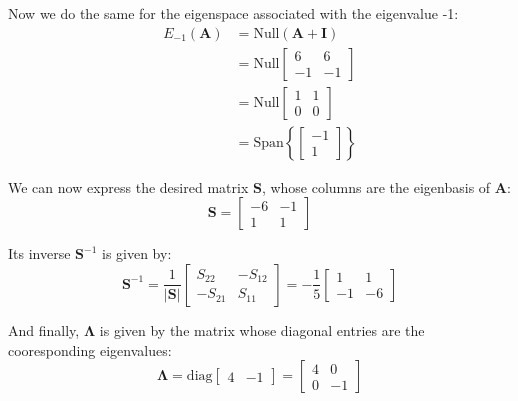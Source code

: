 \documentclass{article}
\begin{document}
Now we do the same for the eigenspace associated with the eigenvalue -1:
\begin{align*}
    E_{-1}(\mathbf{A})&=\text{Null}(\mathbf{A}+\mathbf{I})\tag{def. of eigenspace}\\
    &=\text{Null}\begin{bmatrix} 6 & 6 \\ -1 & -1 \end{bmatrix}\\
    &=\text{Null}\begin{bmatrix} 1 & 1 \\ 0 & 0 \end{bmatrix}\tag{rref}\\
    &=\text{Span}\left\{\begin{bmatrix} -1\\1\end{bmatrix}\right\}\tag{$x_1=-x_2$}
\end{align*}

We can now express the desired matrix $\mathbf{S}$, whose columns are the eigenbasis of $\mathbf{A}$:
\begin{equation*}
    \mathbf{S}=\begin{bmatrix} -6&-1\\1&1\end{bmatrix}
\end{equation*}

Its inverse $\mathbf{S}^{-1}$ is given by:
\begin{equation*}
\mathbf{S}^{-1}=\frac{1}{|\mathbf{S}|}\begin{bmatrix} S_{22}&-S_{12}\\-S_{21}&S_{11}\end{bmatrix}=-\frac{1}{5}\begin{bmatrix} 1&1\\-1&-6\end{bmatrix}
\end{equation*}

And finally, $\mathbf{\Lambda}$ is given by the matrix whose diagonal entries are the cooresponding eigenvalues:
\begin{equation*}
\mathbf{\Lambda}=\text{diag}\begin{bmatrix}4&-1\end{bmatrix}=\begin{bmatrix} 4&0\\0&-1\end{bmatrix}
\end{equation*}
\end{document}
